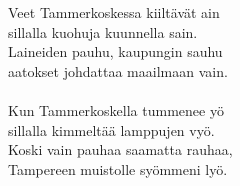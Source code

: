 
            Veet Tammerkoskessa kiiltävät ain \\
            sillalla kuohuja kuunnella sain. \\
            Laineiden pauhu, kaupungin sauhu \\
            aatokset johdattaa maailmaan vain. \\
\hspace{10mm} \\
            Kun Tammerkoskella tummenee yö \\
            sillalla kimmeltää lamppujen vyö. \\
            Koski vain pauhaa saamatta rauhaa, \\
            Tampereen muistolle syömmeni lyö. \\
